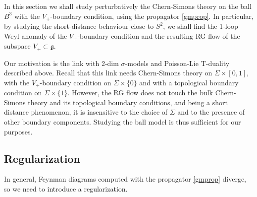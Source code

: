 \documentclass[a4paper]{amsart}
\theoremstyle{plain}
\theoremstyle{definition}
\newcommand{\g}{\mathfrak{g}}
\newcommand{\h}{\mathfrak{h}}
\newcommand{\cf}{\mathsf{Conf}}
\begin{document}
 In this section we shall study perturbatively the Chern-Simons theory on the ball $B^3$ with the $V_+$-boundary condition, using the propagator \eqref{gmprop}. In particular, by studying  the short-distance behaviour close to $S^2$, we shall find the 1-loop Weyl anomaly of the $V_+$-boundary condition and the resulting RG flow of the subspace $V_+\subset\g$.
 
Our motivation is the link with 2-dim $\sigma$-models and Poisson-Lie T-duality described above. Recall that this link needs Chern-Simons theory on $\Sigma\times[0,1]$, with the $V_+$-boundary condition on $\Sigma\times\{0\}$ and with a topological boundary condition on $\Sigma\times\{1\}$. However, the RG flow does not touch the bulk Chern-Simons theory and its topological boundary conditions, and being a short distance phenomenon, it is insensitive to the choice of $\Sigma$ and to the presence of other boundary components. Studying the ball model is thus sufficient for our purposes.




\subsection{Regularization}

In general, Feynman diagrams computed with the propagator \eqref{gmprop} diverge, so we need to introduce a regularization.
\end{document}

